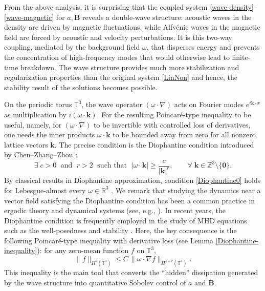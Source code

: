 \documentclass[12pt, reqno]{amsart}
\numberwithin{equation}{section}
\numberwithin{equation}{section}
\numberwithin{equation}{section}
\numberwithin{equation}{section}
\theoremstyle{remark}
\def\b{ \mathbf{B} }
\begin{document}
\medskip
From the above analysis, it is surprising that the coupled system \eqref{wave-density}--\eqref{wave-magnetic} for $a, \b$  reveals a double-wave structure:  acoustic waves in the density are driven
by magnetic fluctuations, while Alfv\'{e}nic waves in the magnetic field are
forced by acoustic and velocity perturbations.  It is this
two-way coupling, mediated by the background field $\omega$, that
disperses energy and prevents the concentration of high-frequency modes
that would otherwise lead to finite-time breakdown. The wave
structure  provides much more stabilization and regularization properties
than the original system \eqref{LinNon}  and hence, the stability result of
the solutions becomes possible.

\medskip
On the periodic torus $\mathbb{T}^3$, the wave operator $(\omega\cdot\nabla)$
acts on Fourier modes $e^{i\mathbf{k}\cdot x}$ as multiplication by
$i(\omega\cdot\mathbf{k})$.  For the resulting Poincar\'e-type inequality
to be useful, namely, for $(\omega\cdot\nabla)$ to be invertible with
controlled loss of derivatives, one needs the inner products
$\omega\cdot\mathbf{k}$ to be bounded away from zero for all nonzero
lattice vectors $\mathbf{k}$.  The precise condition is the
Diophantine condition introduced by Chen--Zhang--Zhou \cite{Chen-Zhang-Zhou}:
\begin{equation}\label{Diophantine0}
	\exists\; c>0 \;\text{ and }\; r>2 \;\text{ such that }\;
	|\omega\cdot\mathbf{k}| \geq \frac{c}{|\mathbf{k}|^r}, \qquad
	\forall\;\mathbf{k}\in\mathbb{Z}^3\setminus\{\mathbf{0}\}.
\end{equation}
By classical results in Diophantine approximation, condition
\eqref{Diophantine0} holds for Lebesgue-almost every $\omega\in\mathbb{R}^3$
\cite{Chen-Zhang-Zhou}. We remark that studying the dynamics near a vector field satisfying the
Diophantine condition has been a common practice in ergodic theory and
dynamical systems (see, e.g., \cite{Cas, Koc, Lop}). In recent years,  the Diophantine condition is frequently employed in the study of MHD equations such as  the well-posedness \cite{Jiang-Jang1,Wu-Zhai} and stability \cite{Liss,RZZ}. Here, the key consequence is the following Poincar\'{e}-type
inequality with derivative loss (see Lemma \ref{Diophantine-inequality}):
for any zero-mean function $f$ on $\mathbb{T}^3$,
\begin{equation}\label{Poincare-Diophantine}
	\|f\|_{H^s(\mathbb{T}^3)} \leq C\,\|\omega\cdot\nabla f\|_{H^{s+r}(\mathbb{T}^3)}.
\end{equation}
This inequality is the main tool that converts the ``hidden'' dissipation
generated by the wave structure into quantitative Sobolev control of
$a$ and $\b$.
\end{document}
